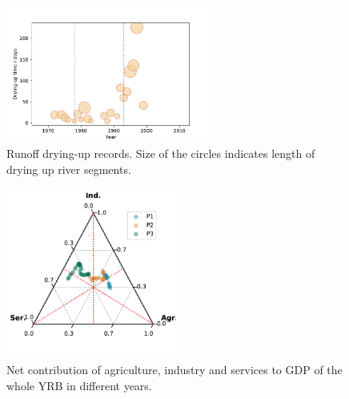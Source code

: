 \documentclass[9pt,twoside,lineno]{pnas-new}
\begin{document}
\begin{figure}
    \centering
    \includegraphics[width=0.6\textwidth]{../../figures/sup/outages.pdf}
    \caption{Runoff drying-up records. Size of the circles indicates length of drying up river segments.}
\end{figure}



\begin{figure}
    \centering
    \includegraphics[width=0.5\textwidth]{../../figures/sup/ternary.pdf}
    \caption{Net contribution of agriculture, industry and services to GDP of the whole YRB in different years.}
\end{figure}



\end{document}
